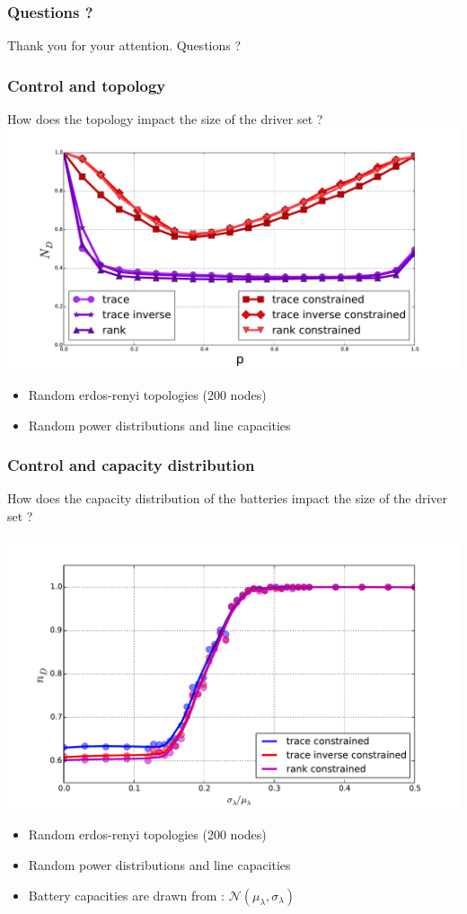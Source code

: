 \documentclass[xcolor=dvipsnames]{beamer}
\begin{document}
\begin{frame}
	\frametitle{Questions ?}
	
	\begin{center}
		Thank you for your attention. Questions ?
	\end{center}
\end{frame}

\begin{frame}
	\frametitle{Control and topology}
	
	How does the topology impact the size of the driver set ?	
	\includegraphics[scale=.3]{figure_4}
	\begin{itemize}
		\item Random erdos-renyi topologies (200 nodes)
		\item Random power distributions and line capacities
	\end{itemize}
\end{frame}

\begin{frame}
	\frametitle{Control and capacity distribution}
	
	How does the capacity distribution of the batteries impact the size of the driver set ?
	
	\includegraphics[scale=.3]{figure_7}
	\begin{itemize}
		\item Random erdos-renyi topologies (200 nodes)
		\item Random power distributions and line capacities
		\item Battery capacities are drawn from : $\mathcal{N}(\mu_{\lambda}, \sigma_{\lambda})$
	\end{itemize}
\end{frame}
\end{document}
